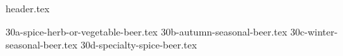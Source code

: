 \clearpage
{}
\divisorLine
{header.tex}
\begin{multicols}{2}
{30a-spice-herb-or-vegetable-beer.tex}
{30b-autumn-seasonal-beer.tex}
{30c-winter-seasonal-beer.tex}
{30d-specialty-spice-beer.tex}
\end{multicols}